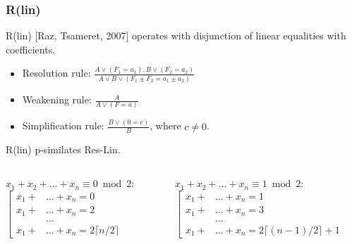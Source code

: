 \begin{frame}
    \frametitle{R(lin)}

    R(lin) [Raz, Tsameret, 2007] operates with disjunction of linear equalities with
     coefficients.
    
	\begin{itemize}
		\item Resolution rule: $\frac{A \lor (F_1 = a_1), B \lor (F_2 = a_2)}
    		{A \lor B \lor (F_1 \pm F_2 = a_1 \pm a_2)}$
		\item Weakening rule: $\frac{A}{A \lor (F = a)}$
		\item Simplification rule: $\frac{B \lor (0 = c)}{B}$, where $c \neq 0$. 
	\end{itemize}

	\pause
    \begin{theorem}
    	R(lin) p-similates Res-Lin.    
    \end{theorem}
    
	\medskip

	\pause
	\begin{columns}
		\begin{column}{5cm}
			$x_1 + x_2 + \dots + x_n \equiv 0 \bmod 2$:
			$\left[\begin{aligned}
            	x_1 + &\dots + x_n = 0\\
                x_1 + &\dots + x_n = 2\\
                &\dots \\
                x_1 + &\dots + x_n = 2 \lceil n / 2 \rceil
            \end{aligned}\right.$ 
		\end{column}
		\begin{column}{5cm}
			$x_1 + x_2 + \dots + x_n \equiv 1 \bmod 2$:
			$\left[\begin{aligned}
                x_1 + &\dots + x_n = 1\\
                x_1 + &\dots + x_n = 3\\
                &\dots \\
                x_1 + &\dots + x_n = 2 \lceil (n - 1) / 2 \rceil + 1
            \end{aligned}\right.$
		\end{column}
	\end{columns}
\end{frame}





